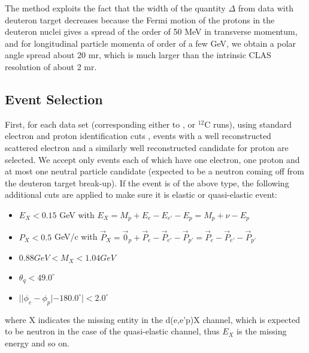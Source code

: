 The method exploits the fact that the width %
of the quantity $\Delta$ from data with deuteron target decreases because the Fermi motion of the protons in the deuteron nuclei gives a spread of the order of 50 MeV in transverse momentum, and for longitudinal particle momenta of order of a few GeV, we obtain a polar angle spread about 20 mr, which is much larger than the intrinsic CLAS resolution of about 2 mr. 


\subsection{Event Selection}
First, for each data set (corresponding either to ,  or $^{12}$C runs), using standard electron and proton identification cuts %
, events %
with a well reconstructed scattered electron and a similarly well reconstructed candidate for proton are selected. 
We accept only events each of which have one electron, one proton and at most one neutral particle candidate (expected to be a neutron coming off from the deuteron target break-up). %
If the event is %
of the above type, %
the following additional cuts are applied to make sure it is elastic or quasi-elastic event:
    \begin{itemize}
       \item $E_X<0.15$ GeV \qquad with $E_X = M_p + E_e - E_{e'} - E_p = M_p + \nu - E_p $
       \item $P_X<0.5$ GeV/c \qquad with $\vec{P}_X = \vec{0}_p + \vec{P}_e - \vec{P}_{e'} - \vec{P}_{p'} = \vec{P}_e - \vec{P}_{e'} - \vec{P}_{p'} $
       \item $0.88 GeV<M_X<1.04 GeV$
       \item $\theta_q<49.0^{\circ}$
       \item $| |\phi_e - \phi_p| - 180.0^{\circ} |<2.0^{\circ}$
    \end{itemize}
where X indicates the missing entity in the d(e,e'p)X channel, which is expected to be neutron in the case of the quasi-elastic channel, thus $E_X$ is the missing energy and so on.

